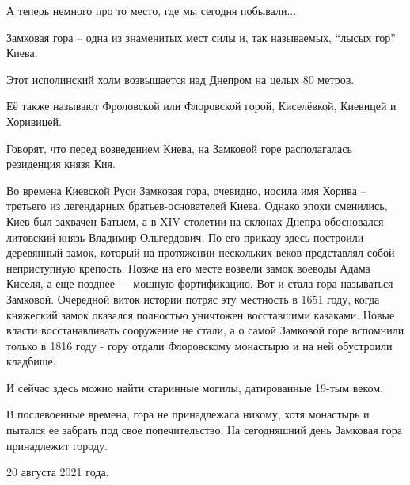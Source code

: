 А теперь немного про то место, где мы сегодня побывали...

Замковая гора – одна из знаменитых мест силы и, так называемых, \enquote{лысых гор}
Киева.

Этот исполинский холм возвышается над Днепром на целых 80 метров.

Её также называют Фроловской или Флоровской горой, Киселёвкой, Киевицей и
Хоривицей.

Говорят, что перед возведением Киева, на Замковой горе располагалась резиденция
князя Кия. 

Во времена Киевской Руси Замковая гора, очевидно, носила имя Хорива – третьего
из легендарных братьев-основателей Киева. Однако эпохи сменились, Киев был
захвачен Батыем, а в XIV столетии на склонах Днепра обосновался литовский князь
Владимир Ольгердович. По его приказу здесь построили деревянный замок, который
на протяжении нескольких веков представлял собой неприступную крепость. Позже
на его месте возвели замок воеводы Адама Киселя, а еще позднее — мощную
фортификацию. Вот и стала гора называться Замковой. Очередной виток истории
потряс эту местность в 1651 году, когда княжеский замок оказался полностью
уничтожен восставшими казаками. Новые власти восстанавливать сооружение не
стали, а о самой Замковой горе вспомнили только в 1816 году  - гору отдали
Флоровскому монастырю и на ней обустроили кладбище.

И сейчас здесь можно найти старинные могилы, датированные 19-тым веком.

В послевоенные времена, гора не принадлежала никому, хотя монастырь и пытался
ее забрать под свое попечительство. На сегодняшний день Замковая гора
принадлежит городу.

20 августа 2021 года.
